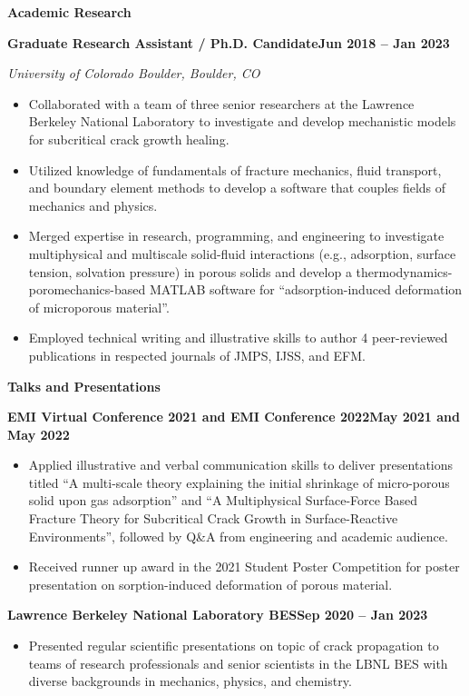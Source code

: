 \documentclass[10pt, letterpaper]{article}
\newcommand{\jobline}[2]{%
  \vspace{5pt}%
  \noindent\textbf{#1}\hfill\textbf{#2}\par%
  \vspace{1pt}%
}
\newcommand{\subline}[1]{%
  \vspace{-1pt}%
  \noindent\textit{#1}\par%
  \vspace{1pt}%
}
\newenvironment{rlist}{%
  \begin{itemize}[leftmargin=1.4em, itemsep=1pt, topsep=2pt, parsep=0pt]%
}{%
  \end{itemize}%
}
\begin{document}
\noindent\textbf{Academic Research}

\jobline{Graduate Research Assistant / Ph.D. Candidate}{Jun 2018 -- Jan 2023}
\subline{University of Colorado Boulder, Boulder, CO}
\begin{rlist}
  \item Collaborated with a team of three senior researchers at the Lawrence Berkeley National Laboratory to investigate and develop mechanistic models for subcritical crack growth healing.
  \item Utilized knowledge of fundamentals of fracture mechanics, fluid transport, and boundary element methods to develop a software that couples fields of mechanics and physics.
  \item Merged expertise in research, programming, and engineering to investigate multiphysical and multiscale solid-fluid interactions (e.g., adsorption, surface tension, solvation pressure) in porous solids and develop a thermodynamics-poromechanics-based MATLAB software for ``adsorption-induced deformation of microporous material''.
  \item Employed technical writing and illustrative skills to author 4 peer-reviewed publications in respected journals of JMPS, IJSS, and EFM.
\end{rlist}

\vspace{4pt}
\noindent\textbf{Talks and Presentations}

\jobline{EMI Virtual Conference 2021 and EMI Conference 2022}{May 2021 and May 2022}
\begin{rlist}
  \item Applied illustrative and verbal communication skills to deliver presentations titled ``A multi-scale theory explaining the initial shrinkage of micro-porous solid upon gas adsorption'' and ``A Multiphysical Surface-Force Based Fracture Theory for Subcritical Crack Growth in Surface-Reactive Environments'', followed by Q\&A from engineering and academic audience.
  \item Received runner up award in the 2021 Student Poster Competition for poster presentation on sorption-induced deformation of porous material.
\end{rlist}

\jobline{Lawrence Berkeley National Laboratory BES}{Sep 2020 -- Jan 2023}
\begin{rlist}
  \item Presented regular scientific presentations on topic of crack propagation to teams of research professionals and senior scientists in the LBNL BES with diverse backgrounds in mechanics, physics, and chemistry.
\end{rlist}
\end{document}
